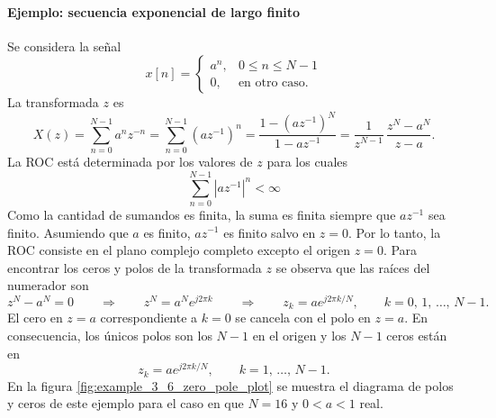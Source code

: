 \documentclass[a4paper]{report}
\begin{document}
\paragraph{Ejemplo: secuencia exponencial de largo finito} Se considera la señal
\[
 x[n]=
 \left\{
 \begin{array}{ll}
  a^n, & 0\leq n\leq N-1\\
  0, & \textrm{en otro caso.}
 \end{array}
 \right.
\]
La transformada \(z\) es
\[
 X(z)=\sum_{n=0}^{N-1}a^nz^{-n}=\sum_{n=0}^{N-1}(az^{-1})^n=\frac{1-(az^{-1})^N}{1-az^{-1}}
  =\frac{1}{z^{N-1}}\,\frac{z^N-a^N}{z-a}.
\]
La ROC está determinada por los valores de \(z\) para los cuales
\[
 \sum_{n=0}^{N-1}|az^{-1}|^n<\infty
\]
Como la cantidad de sumandos es finita, la suma es finita siempre que \(az^{-1}\) sea finito. Asumiendo que \(a\) es finito, \(az^{-1}\) es finito salvo en \(z=0\). Por lo tanto, la ROC consiste en el plano complejo completo excepto el origen \(z=0\). Para encontrar los ceros y polos de la transformada \(z\) se observa que las raíces del numerador son
\[
 z^N-a^N=0
 \qquad\Rightarrow\qquad
 z^N=a^Ne^{j2\pi k}
 \qquad\Rightarrow\qquad
 z_k=ae^{j2\pi k/N},\qquad 
 k=0,\,1,\,\dots,\,N-1.
\]
El cero en \(z=a\) correspondiente a \(k=0\) se cancela con el polo en \(z=a\). En consecuencia, los únicos polos son los \(N-1\) en el origen y los \(N-1\) ceros están en
\[
 z_k=ae^{j2\pi k/N},\qquad 
 k=1,\,\dots,\,N-1.
\]
En la figura \ref{fig:example_3_6_zero_pole_plot} se muestra el diagrama de polos y ceros de este ejemplo para el caso en que \(N=16\) y \(0<a<1\) real.
\end{document}
